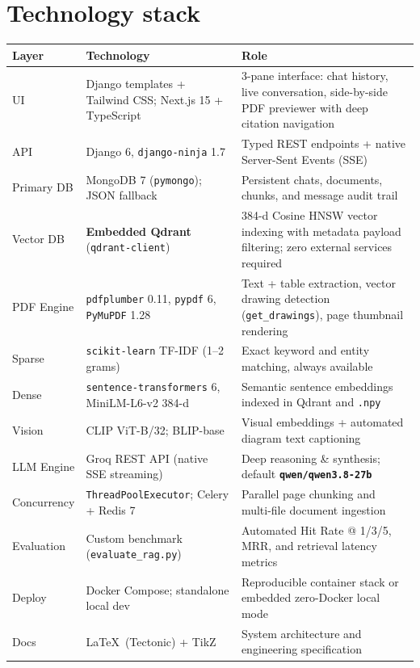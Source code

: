 \documentclass[11pt,a4paper]{article}
\begin{document}
\section{Technology stack}
{\footnotesize
\begin{center}
\begin{tabular}{@{}lp{4.4cm}p{7.4cm}@{}}
\toprule
Layer & Technology & Role \\
\midrule
UI & Django templates + Tailwind CSS; Next.js 15 + TypeScript & 3-pane interface: chat history, live conversation, side-by-side PDF previewer with deep citation navigation \\
API & Django 6, \texttt{django-ninja} 1.7 & Typed REST endpoints + native Server-Sent Events (SSE) \\
Primary DB & MongoDB 7 (\texttt{pymongo}); JSON fallback & Persistent chats, documents, chunks, and message audit trail \\
Vector DB & \textbf{Embedded Qdrant} (\texttt{qdrant-client}) & 384-d Cosine HNSW vector indexing with metadata payload filtering; zero external services required \\
PDF Engine & \texttt{pdfplumber} 0.11, \texttt{pypdf} 6, \texttt{PyMuPDF} 1.28 & Text + table extraction, vector drawing detection (\texttt{get\_drawings}), page thumbnail rendering \\
Sparse & \texttt{scikit-learn} TF-IDF (1--2 grams) & Exact keyword and entity matching, always available \\
Dense & \texttt{sentence-transformers} 6, MiniLM-L6-v2 384-d & Semantic sentence embeddings indexed in Qdrant and \texttt{.npy} \\
Vision & CLIP ViT-B/32; BLIP-base & Visual embeddings + automated diagram text captioning \\
LLM Engine & Groq REST API (native SSE streaming) & Deep reasoning \& synthesis; default \textbf{\texttt{qwen/qwen3.8-27b}} \\
Concurrency & \texttt{ThreadPoolExecutor}; Celery + Redis 7 & Parallel page chunking and multi-file document ingestion \\
Evaluation & Custom benchmark (\texttt{evaluate\_rag.py}) & Automated Hit Rate @ 1/3/5, MRR, and retrieval latency metrics \\
Deploy & Docker Compose; standalone local dev & Reproducible container stack or embedded zero-Docker local mode \\
Docs & \LaTeX\ (Tectonic) + TikZ & System architecture and engineering specification \\
\bottomrule
\end{tabular}
\end{center}
}
\end{document}

